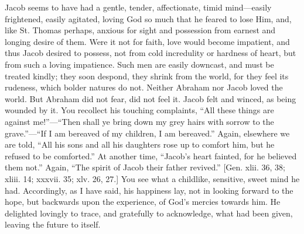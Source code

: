Jacob seems to have had a gentle, tender, affectionate, timid mind—easily
frightened, easily agitated, loving God so much that he feared to lose
Him, and, like St. Thomas perhaps, anxious for sight and possession
from earnest and longing desire of them. Were it not for faith, love
would become impatient, and thus Jacob desired to possess, not from
cold incredulity or hardness of heart, but from such a loving
impatience. Such men are easily downcast, and must be treated kindly;
they soon despond, they shrink from the world, for they feel its
rudeness, which bolder natures do not. Neither Abraham nor Jacob loved
the world. But Abraham did not fear, did not feel it. Jacob felt and
winced, as being wounded by it. You recollect his touching complaints,
``All these things are against me!''—``Then shall ye
bring down my grey hairs with sorrow to the grave.''—``If I
am bereaved of my children, I am bereaved.'' Again, elsewhere we
are told, ``All his sons and all his daughters rose up to comfort
him, but he refused to be comforted.'' At another time, ``Jacob's heart fainted, for he believed them not.'' Again,
``The spirit of Jacob their father revived.'' [Gen. xlii. 36,
38; xliii. 14; xxxvii. 35; xlv. 26, 27.] You see what a childlike,
sensitive, sweet mind he had. Accordingly, as I have said, his
happiness lay, not in looking forward to the hope, but backwards upon
the experience, of God's mercies towards him. He delighted lovingly to
trace, and gratefully to acknowledge, what had been given, leaving the
future to itself.

